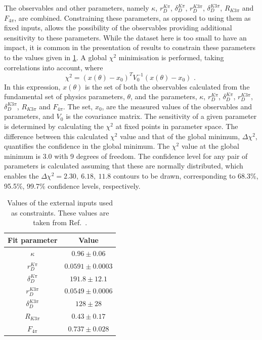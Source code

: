 The \CP observables and other parameters, namely $\kappa$, $r_D^{K\pi}$, $\delta_D^{K\pi}$, $r_D^{K3\pi}$, $\delta_D^{K3\pi}$, $R_{K3\pi}$ and $F_{4\pi}$, are combined. Constraining these parameters, as opposed to using them as fixed inputs, allows the possibility of the \CP observables providing additional sensitivity to these parameters. While the dataset here is too small to have an impact, it is common in the presentation of \lhcb results to constrain these parameters to the values given in \tab\ref{inputparameters}. A global $\chi^2$ minimisation is performed, taking correlations into account, where
\begin{equation}
\chi^2 = (x(\theta) - x_0)^TV_0^{-1}(x(\theta)-x_0) \text{ . }
\end{equation}
In this expression, $x(\theta)$ is the set of both the observables calculated from the fundamental set of physics parameters, $\theta$, and the parameters, $\kappa$, $r_D^{K\pi}$, $\delta_D^{K\pi}$, $r_D^{K3\pi}$, $\delta_D^{K3\pi}$, $R_{K3\pi}$ and $F_{4\pi}$. The set, $x_0$, are the measured values of the observables and parameters, and $V_0$ is the covariance matrix. The sensitivity of a given parameter is determined by calculating the $\chi^2$ at fixed points in parameter space. The difference between this calculated $\chi^2$ value and that of the global minimum, $\Delta\chi^2$, quantifies the confidence in the global minimum. The $\chi^2$ value at the global minimum is 3.0 with 9 degrees of freedom. The confidence level for any pair of parameters is calculated assuming that these are normally distributed, which enables the $\Delta \chi^2 = 2.30,\ 6.18,\ 11.8$ contours to be drawn, corresponding to 68.3\%, 95.5\%, 99.7\% confidence levels, respectively. 

\begin{table}
\centering
\begin{tabular}{cc}
Fit parameter & Value \\
\hline
$\kappa$ & $0.96 \pm 0.06$ \\
$r_D^{K\pi}$ & $0.0591 \pm 0.0003$ \\
$\delta_D^{K\pi}$ & $191.8 \pm 12.1$ \\
$r_D^{K3\pi}$ & $0.0549 \pm 0.0006$ \\
$\delta_D^{K3\pi}$ & $128 \pm 28$ \\
$R_{K3\pi}$ & $0.43 \pm 0.17$ \\
$F_{4\pi}$ & $0.737 \pm 0.028$
\end{tabular}
\caption{Values of the external inputs used as constraints. These values are taken from Ref.~\cite{HFAG,charmk3pi,charmk3pi_errata,charm4pi}.}
\label{inputparameters}
\end{table}

